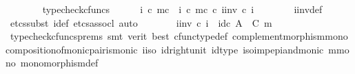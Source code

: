 \begin{isabellebody}
\ \ \ \ \ \ \isamarkupfalse%
\ typecheck{\isacharunderscore}{\kern0pt}cfuncs\isanewline
\ \ \ \ \isamarkupfalse%
\ {\isachardoublequoteopen}i\ {\isasymcirc}\isactrlsub c\ m\isactrlsup c\ {\isacharequal}{\kern0pt}\ {\isacharparenleft}{\kern0pt}i\ {\isasymcirc}\isactrlsub c\ m\isactrlsup c{\isacharparenright}{\kern0pt}\ {\isasymcirc}\isactrlsub c\ i{\isacharprime}{\kern0pt}{\isacharunderscore}{\kern0pt}inv\ {\isasymcirc}\isactrlsub c\ i{\isacharprime}{\kern0pt}{\isachardoublequoteclose}\isanewline
\ \ \ \ \ \ \isamarkupfalse%
\ i{\isacharprime}{\kern0pt}{\isacharunderscore}{\kern0pt}inv{\isacharunderscore}{\kern0pt}def\ \isamarkupfalse%
\ {\isacharparenleft}{\kern0pt}etcs{\isacharunderscore}{\kern0pt}subst\ i{\isacharprime}{\kern0pt}{\isacharunderscore}{\kern0pt}def{\isacharcomma}{\kern0pt}\ etcs{\isacharunderscore}{\kern0pt}assocl{\isacharcomma}{\kern0pt}\ auto{\isacharparenright}{\kern0pt}\isanewline
\ \ \ \ \isamarkupfalse%
\ \isamarkupfalse%
\ {\isachardoublequoteopen}i{\isacharprime}{\kern0pt}{\isacharunderscore}{\kern0pt}inv\ {\isasymcirc}\isactrlsub c\ i{\isacharprime}{\kern0pt}\ {\isacharequal}{\kern0pt}\ id\isactrlsub c\ {\isacharparenleft}{\kern0pt}A\ {\isasymsetminus}\ {\isacharparenleft}{\kern0pt}C{\isacharcomma}{\kern0pt}\ m{\isacharparenright}{\kern0pt}{\isacharparenright}{\kern0pt}{\isachardoublequoteclose}\isanewline
\ \ \ \ \ \ \isamarkupfalse%
\ {\isacharparenleft}{\kern0pt}typecheck{\isacharunderscore}{\kern0pt}cfuncs{\isacharunderscore}{\kern0pt}prems{\isacharcomma}{\kern0pt}\ smt\ {\isacharparenleft}{\kern0pt}verit{\isacharcomma}{\kern0pt}\ best{\isacharparenright}{\kern0pt}\ cfunc{\isacharunderscore}{\kern0pt}type{\isacharunderscore}{\kern0pt}def\ complement{\isacharunderscore}{\kern0pt}morphism{\isacharunderscore}{\kern0pt}mono\ composition{\isacharunderscore}{\kern0pt}of{\isacharunderscore}{\kern0pt}monic{\isacharunderscore}{\kern0pt}pair{\isacharunderscore}{\kern0pt}is{\isacharunderscore}{\kern0pt}monic\ i{\isacharunderscore}{\kern0pt}iso\ id{\isacharunderscore}{\kern0pt}right{\isacharunderscore}{\kern0pt}unit{}\ id{\isacharunderscore}{\kern0pt}type\ iso{\isacharunderscore}{\kern0pt}imp{\isacharunderscore}{\kern0pt}epi{\isacharunderscore}{\kern0pt}and{\isacharunderscore}{\kern0pt}monic\ m{\isacharunderscore}{\kern0pt}mono\ monomorphism{\isacharunderscore}{\kern0pt}def{}{\isacharparenright}{\kern0pt}\isanewline
\ \ \isamarkupfalse%
\isanewline
\ \ \ \ \isamarkupfalse%

\end{isabellebody}
